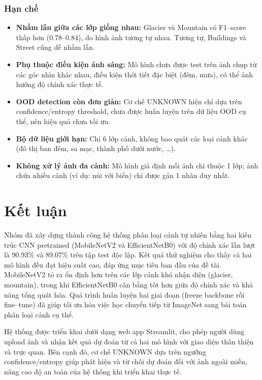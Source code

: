 \documentclass[12pt,a4paper]{article}
\begin{document}
\subsubsection{Hạn chế}
\begin{itemize}
    \item \textbf{Nhầm lẫn giữa các lớp giống nhau:} Glacier và Mountain có F1--score thấp hơn (0.78--0.84), do hình ảnh tương tự nhau. Tương tự, Buildings và Street cũng dễ nhầm lẫn.
    
    \item \textbf{Phụ thuộc điều kiện ánh sáng:} Mô hình chưa được test trên ảnh chụp từ các góc nhìn khác nhau, điều kiện thời tiết đặc biệt (đêm, mưa), có thể ảnh hưởng độ chính xác thực tế.
    
    \item \textbf{OOD detection còn đơn giản:} Cơ chế UNKNOWN hiện chỉ dựa trên confidence/entropy threshold, chưa được huấn luyện trên dữ liệu OOD cụ thể, nên hiệu quả chưa tối ưu.
    
    \item \textbf{Bộ dữ liệu giới hạn:} Chỉ 6 lớp cảnh, không bao quát các loại cảnh khác (đô thị ban đêm, sa mạc, thành phố dưới nước, \ldots).
    
    \item \textbf{Không xử lý ảnh đa cảnh:} Mô hình giả định mỗi ảnh chỉ thuộc 1 lớp; ảnh chứa nhiều cảnh (ví dụ: núi với biển) chỉ được gán 1 nhãn duy nhất.
\end{itemize}
\section{Kết luận}

Nhóm đã xây dựng thành công hệ thống phân loại cảnh tự nhiên bằng hai kiến trúc CNN pretrained (MobileNetV2 và EfficientNetB0) với độ chính xác lần lượt là 90.93\% và 89.07\% trên tập test độc lập. Kết quả thử nghiệm cho thấy cả hai mô hình đều đạt hiệu suất cao, đáp ứng mục tiêu ban đầu của đề tài. MobileNetV2 tỏ ra ổn định hơn trên các lớp cảnh khó nhận diện (glacier, mountain), trong khi EfficientNetB0 cân bằng tốt hơn giữa độ chính xác và khả năng tổng quát hóa. Quá trình huấn luyện hai giai đoạn (freeze backbone rồi fine--tune) đã giúp tối ưu hóa việc học chuyển tiếp từ ImageNet sang bài toán phân loại cảnh cụ thể.

Hệ thống được triển khai dưới dạng web app Streamlit, cho phép người dùng upload ảnh và nhận kết quả dự đoán từ cả hai mô hình với giao diện thân thiện và trực quan. Bên cạnh đó, cơ chế UNKNOWN dựa trên ngưỡng confidence/entropy giúp phát hiện và từ chối dự đoán đối với ảnh ngoài miền, nâng cao độ an toàn của hệ thống khi triển khai thực tế.
\end{document}
